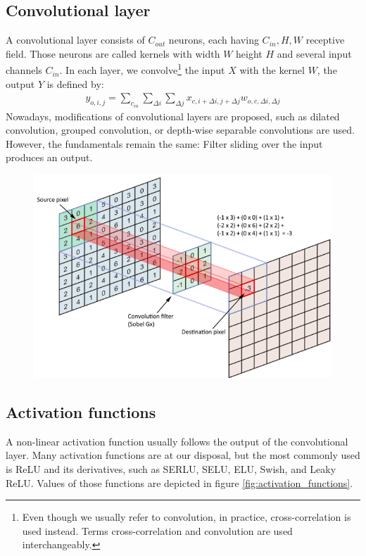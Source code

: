 \subsection{Convolutional layer}
A convolutional layer consists of $C_{out}$ neurons, each having $C_{in}, H, W$ receptive field. Those neurons are called kernels with width $W$ height $H$ and several input channels $C_{in}$. In each layer, we convolve\footnote{Even though we usually refer to convolution, in practice, cross-correlation is used instead. Terms cross-correlation and convolution are used interchangeably.} the input $X$  with the kernel $W$, the output $Y$ is defined by:
\begin{align}
    y_{o,i,j} = \sum_{c_{in}} \sum_{\Delta i} \sum_{\Delta j} x_{c, i+\Delta i, j + \Delta j}  w_{o,c, \Delta i, \Delta j}
\end{align}
Nowadays, modifications of convolutional layers are proposed, such as dilated convolution, grouped convolution, or depth-wise separable convolutions are used. However, the fundamentals remain the same: Filter sliding over the input produces an output.

\begin{figure}
    \centering
    \includegraphics[width=0.9\linewidth]{images/conv_img.png}
\end{figure}

\subsection{Activation functions}
A non-linear activation function usually follows the output of the convolutional layer. Many activation functions are at our disposal, but the most commonly used is ReLU and its derivatives, such as SERLU, SELU, ELU, Swish, and Leaky ReLU. Values of those functions are depicted in figure \ref{fig:activation_functions}.

